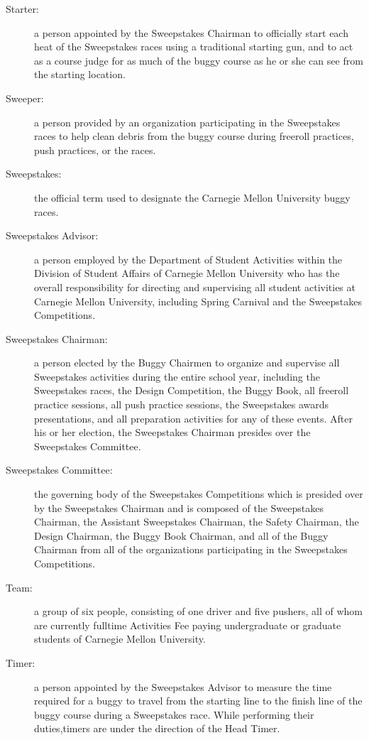\begin{description}
	\item[Starter:]
	a person appointed by the Sweepstakes Chairman to officially start each
	heat of the Sweepstakes races using a traditional starting gun, and to act as a
	course judge for as much of the buggy course as he or she can see from the
	starting location.

	\item[Sweeper:]
	a person provided by an organization participating in the Sweepstakes races
	to help clean debris from the buggy course during freeroll practices, push
	practices, or the races.

	\item[Sweepstakes:]
	the official term used to designate the Carnegie Mellon University buggy
	races.

	\item[Sweepstakes Advisor:]
	a person employed by the Department of Student Activities within the
	Division of Student Affairs of Carnegie Mellon University who has the overall
	responsibility for directing and supervising all student activities at Carnegie
	Mellon University, including Spring Carnival and the Sweepstakes Competitions.

	\item[Sweepstakes Chairman:]
	a person elected by the Buggy Chairmen to organize and supervise all
	Sweepstakes activities during the entire school year, including the Sweepstakes
	races, the Design Competition, the Buggy Book, all freeroll practice sessions,
	all push practice sessions, the Sweepstakes awards presentations, and all
	preparation activities for any of these events. After his or her election, the
	Sweepstakes Chairman presides over the Sweepstakes Committee.

	\item[Sweepstakes Committee:]
	the governing body of the Sweepstakes Competitions which is presided over
	by the Sweepstakes Chairman and is composed of the Sweepstakes Chairman, the
	Assistant Sweepstakes Chairman, the Safety Chairman, the Design Chairman, the
	Buggy Book Chairman, and all of the Buggy Chairman from all of the
	organizations participating in the Sweepstakes Competitions.

	\item[Team:]
	a group of six people, consisting of one driver and five pushers, all of
	whom are currently fulltime Activities Fee paying undergraduate or graduate
	students of Carnegie Mellon University.

	\item[Timer:]
	a person appointed by the Sweepstakes Advisor to measure the time required
	for a buggy to travel from the starting line to the finish line of the buggy
	course during a Sweepstakes race. While performing their duties,timers are
	under the direction of the Head Timer.


\end{description}
